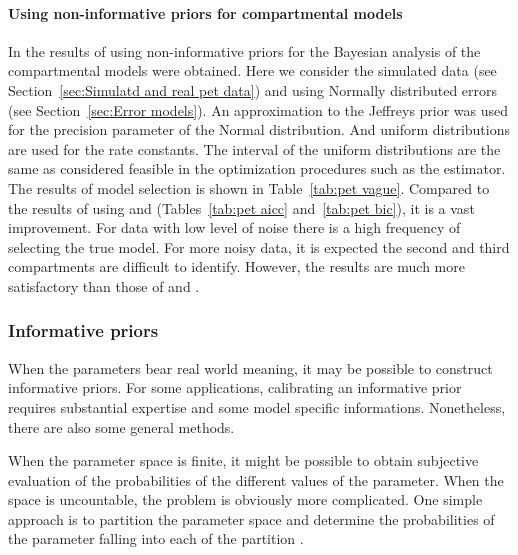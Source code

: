 \paragraph{Using non-informative priors for \pet compartmental models}

In \cite{Zhou2013} the results of using non-informative priors for the
Bayesian analysis of the \pet compartmental models were obtained. Here we
consider the simulated data (see Section~\ref{sec:Simulatd and real pet data})
and using Normally distributed errors (see Section~\ref{sec:Error models}). An
approximation to the Jeffreys prior was used for the precision parameter of
the Normal distribution. And uniform distributions are used for the rate
constants. The interval of the uniform distributions are the same as
considered feasible in the optimization procedures such as the \nls estimator.
The results of model selection is shown in Table~\ref{tab:pet vague}. Compared
to the results of using \aicc and \bic (Tables~\ref{tab:pet aicc}
and~\ref{tab:pet bic}), it is a vast improvement. For data with low level of
noise there is a high frequency of selecting the true model. For more noisy
data, it is expected the second and third compartments are difficult to
identify. However, the results are much more satisfactory than those of \aicc
and \bic.



\subsubsection{Informative priors}
\label{ssub:Informative priors}

When the parameters bear real world meaning, it may be possible to construct
informative priors. For some applications, calibrating an informative prior
requires substantial expertise and some model specific informations.
Nonetheless, there are also some general methods.

When the parameter space is finite, it might be possible to obtain subjective
evaluation of the probabilities of the different values of the parameter. When
the space is uncountable, the problem is obviously more complicated. One
simple approach is to partition the parameter space and determine the
probabilities of the parameter falling into each of the partition
\cite[][sec.~3.2.2]{Robert:2007tc}.

